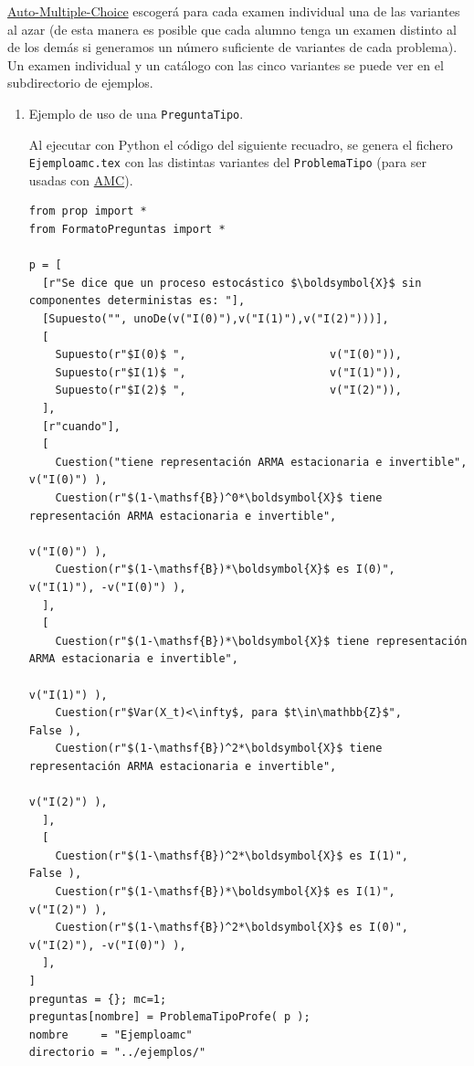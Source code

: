 \documentclass[10pt,a4paper]{report}
\begin{document}
\href{https://www.auto-multiple-choice.net/}{Auto-Multiple-Choice}
escogerá para cada examen individual una de las variantes al azar (de
esta manera es posible que cada alumno tenga un examen distinto al de
los demás si generamos un número suficiente de variantes de cada
problema). Un examen individual y un catálogo con las cinco variantes
se puede ver en el subdirectorio de ejemplos.
\begin{enumerate}
\item Ejemplo de uso de una \texttt{PreguntaTipo}.
\label{sec:org94c9671}

Al ejecutar con Python el código del siguiente recuadro, se genera el
fichero \texttt{Ejemploamc.tex} con las distintas variantes del
\texttt{ProblemaTipo} (para ser usadas con
\href{https://www.auto-multiple-choice.net/}{AMC}).

\begin{verbatim}
from prop import *
from FormatoPreguntas import *

p = [
  [r"Se dice que un proceso estocástico $\boldsymbol{X}$ sin componentes deterministas es: "],
  [Supuesto("", unoDe(v("I(0)"),v("I(1)"),v("I(2)")))],
  [
    Supuesto(r"$I(0)$ ",                      v("I(0)")),    
    Supuesto(r"$I(1)$ ",                      v("I(1)")),    
    Supuesto(r"$I(2)$ ",                      v("I(2)")),    
  ],
  [r"cuando"],
  [
    Cuestion("tiene representación ARMA estacionaria e invertible",                     v("I(0)") ),
    Cuestion(r"$(1-\mathsf{B})^0*\boldsymbol{X}$ tiene representación ARMA estacionaria e invertible",
                                                                                        v("I(0)") ),
    Cuestion(r"$(1-\mathsf{B})*\boldsymbol{X}$ es I(0)",                                v("I(1)"), -v("I(0)") ),
  ],
  [
    Cuestion(r"$(1-\mathsf{B})*\boldsymbol{X}$ tiene representación ARMA estacionaria e invertible",
                                                                                        v("I(1)") ),
    Cuestion(r"$Var(X_t)<\infty$, para $t\in\mathbb{Z}$",                                     False ),
    Cuestion(r"$(1-\mathsf{B})^2*\boldsymbol{X}$ tiene representación ARMA estacionaria e invertible",
                                                                                        v("I(2)") ),
  ], 
  [
    Cuestion(r"$(1-\mathsf{B})^2*\boldsymbol{X}$ es I(1)",                                  False ),
    Cuestion(r"$(1-\mathsf{B})*\boldsymbol{X}$ es I(1)",                                v("I(2)") ),
    Cuestion(r"$(1-\mathsf{B})^2*\boldsymbol{X}$ es I(0)",                              v("I(2)"), -v("I(0)") ),
  ],
]
preguntas = {}; mc=1;
preguntas[nombre] = ProblemaTipoProfe( p );
nombre     = "Ejemploamc"
directorio = "../ejemplos/"


\end{verbatim}
\end{enumerate}
\end{document}
